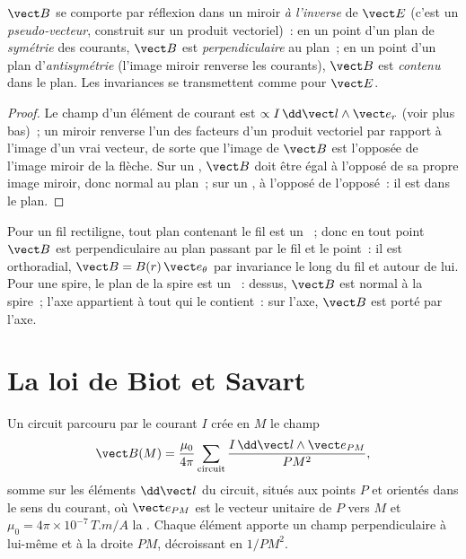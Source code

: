 \begin{proposition}\label{prop:b1:magnetostatics:symmetry}
$\vect B$ se comporte par réflexion dans un miroir \emph{à l'inverse} de
$\vect E$ (c'est un \emph{pseudo-vecteur}, construit sur un produit
vectoriel)~: en un point d'un plan de \emph{symétrie} des courants, $\vect B$
est \emph{perpendiculaire} au plan~; en un point d'un plan
d'\emph{antisymétrie} (l'image miroir renverse les courants), $\vect B$ est
\emph{contenu} dans le plan. Les invariances se transmettent comme pour $\vect E$.
\end{proposition}

\begin{proof}
Le champ d'un élément de courant est $\propto I\,\dd\vect l\wedge\vect e_r$
(voir plus bas)~; un miroir renverse l'un des facteurs d'un produit vectoriel
par rapport à l'image d'un vrai vecteur, de sorte que l'image de $\vect B$ est
l'opposée de l'image miroir de la flèche. Sur un , $\vect B$
doit être égal à l'opposé de sa propre image miroir, donc normal au plan~; sur
un , à l'opposé de l'opposé~: il est dans le plan.
\end{proof}

\begin{example}\label{ex:b1:magnetostatics:symmetryuse}
Pour un fil rectiligne, tout plan contenant le fil est un ~;
donc en tout point $\vect B$ est perpendiculaire au plan passant par le fil et
le point~: il est orthoradial, $\vect B = B(r)\,\vect e_\theta$ par invariance
le long du fil et autour de lui. Pour une spire, le plan de la spire est un
~: dessus, $\vect B$ est normal à la spire~; l'axe appartient
à tout  qui le contient~: sur l'axe, $\vect B$ est porté par
l'axe.
\end{example}

\section{La loi de Biot et Savart}

\begin{theorem}\label{thm:b1:magnetostatics:biotsavart}
Un circuit parcouru par le courant $I$ crée en $M$ le champ
\[
\vect B(M) = \frac{\mu_0}{4\pi}\sum_{\text{circuit}} \frac{I\,\dd\vect l\wedge\vect e_{PM}}{PM^2} ,
\]
somme sur les éléments $\dd\vect l$ du circuit, situés aux points $P$ et
orientés dans le sens du courant, où $\vect e_{PM}$ est le vecteur unitaire de
$P$ vers $M$ et $\mu_0 = 4\pi \times 10^{-7}\,\unit{T.m/A}$ la
\emph{}. Chaque élément apporte un champ perpendiculaire à
lui-même et à la droite $PM$, décroissant en $1/PM^2$.
\end{theorem}
\admitted

